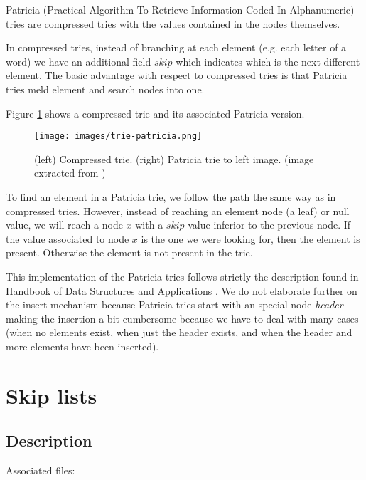 \documentclass[a4paper,10pt,table,xcdraw]{article}
\begin{document}
Patricia (Practical Algorithm To Retrieve Information Coded In
Alphanumeric) tries \cite{Knuth1998} are compressed tries \cite{Maly1976} with the values contained in the nodes themselves. 

In compressed tries, instead of branching at each element (e.g. each letter of a word) we have an additional field $skip$ which indicates which is the next different element. The basic advantage with respect to compressed tries is that Patricia tries meld element and search nodes into one.

Figure \ref{fig:trie-patricia} shows a compressed trie and its associated Patricia version.


\begin{figure}[H]
\centering
\texttt{[image: images/trie-patricia.png]}
\caption{(left) Compressed trie. (right) Patricia trie to left image. (image extracted from \cite{Mehta2005})  }
\label{fig:trie-patricia}
\end{figure}

To find an element in a Patricia trie, we follow the path the same way as in compressed tries. However, instead of reaching an element node (a leaf) or null value, we will reach a node $x$ with a $skip$ value inferior to the previous node. If the value associated to node $x$ is the one we were looking for, then the element is present. Otherwise the element is not present in the trie.

This implementation of the Patricia tries follows strictly the description found in Handbook of Data Structures and Applications \cite{Mehta2005}. We do not elaborate further on the insert mechanism because Patricia tries start with an special node \textit{header} making the insertion a bit cumbersome because we have to deal with many cases (when no elements exist, when just the header exists, and when the header and more elements have been inserted).




\section{Skip lists}
\label{sec:skip-lists}

\subsection{Description}

Associated files:
\end{document}
